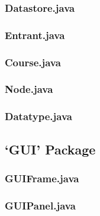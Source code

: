 \documentclass[a4paper, 10pt]{article}
\begin{document}
\subsubsection{Datastore.java}


\clearpage
\subsubsection{Entrant.java}


\clearpage
\subsubsection{Course.java}


\clearpage
\subsubsection{Node.java}


\clearpage
\subsubsection{Datatype.java}


\clearpage
\subsection{`GUI' Package}

\subsubsection{GUIFrame.java}


\clearpage
\subsubsection{GUIPanel.java}

\end{document}
